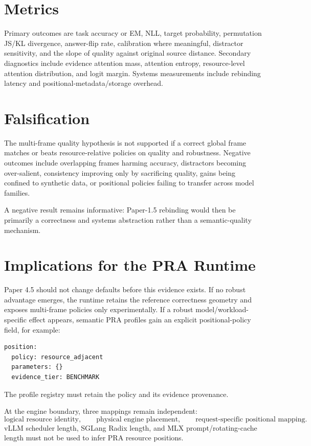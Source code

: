 \documentclass[10pt]{article}
\begin{document}
\section{Metrics}
Primary outcomes are task accuracy or EM, NLL, target probability, permutation JS/KL divergence, answer-flip rate, calibration where meaningful, distractor sensitivity, and the slope of quality against original source distance. Secondary diagnostics include evidence attention mass, attention entropy, resource-level attention distribution, and logit margin. Systems measurements include rebinding latency and positional-metadata/storage overhead.

\section{Falsification}
The multi-frame quality hypothesis is not supported if a correct global frame matches or beats resource-relative policies on quality and robustness. Negative outcomes include overlapping frames harming accuracy, distractors becoming over-salient, consistency improving only by sacrificing quality, gains being confined to synthetic data, or positional policies failing to transfer across model families.

A negative result remains informative: Paper-1.5 rebinding would then be primarily a correctness and systems abstraction rather than a semantic-quality mechanism.

\section{Implications for the PRA Runtime}
Paper 4.5 should not change defaults before this evidence exists. If no robust advantage emerges, the runtime retains the reference correctness geometry and exposes multi-frame policies only experimentally. If a robust model/workload-specific effect appears, semantic PRA profiles gain an explicit positional-policy field, for example:
\begin{verbatim}
position:
  policy: resource_adjacent
  parameters: {}
  evidence_tier: BENCHMARK
\end{verbatim}
The profile registry must retain the policy and its evidence provenance.

At the engine boundary, three mappings remain independent:
\[
\text{logical resource identity},
\qquad
\text{physical engine placement},
\qquad
\text{request-specific positional mapping}.
\]
vLLM scheduler length, SGLang Radix length, and MLX prompt/rotating-cache length must not be used to infer PRA resource positions.
\end{document}
